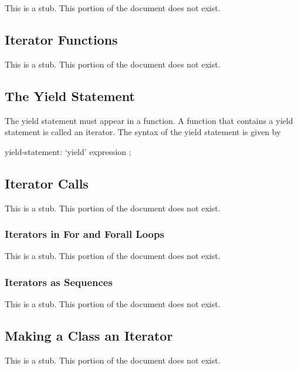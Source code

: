 \label{Iterators}

This is a stub.  This portion of the document does not exist.

\subsection{Iterator Functions}
\label{Iterator_Functions}

This is a stub.  This portion of the document does not exist.

\subsection{The Yield Statement}
\label{The_Yield_Statement}

The yield statement must appear in a function.  A function that
contains a yield statement is called an iterator.  The syntax of the
yield statement is given by
\begin{syntax}
yield-statement:
  `yield' expression ;
\end{syntax}

\subsection{Iterator Calls}
\label{Iterator_Calls}

This is a stub.  This portion of the document does not exist.

\subsubsection{Iterators in For and Forall Loops}
\label{Iterators_in_For_and_Forall_Loops}

This is a stub.  This portion of the document does not exist.

\subsubsection{Iterators as Sequences}
\label{Iterators_as_Sequences}

This is a stub.  This portion of the document does not exist.

\subsection{Making a Class an Iterator}
\label{Making_a_Class_an_Iterator}

This is a stub.  This portion of the document does not exist.

